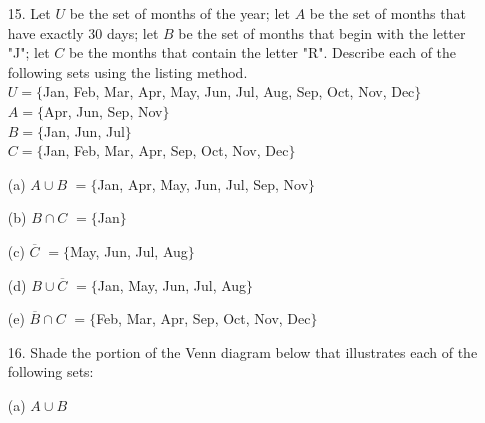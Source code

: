 \documentclass{article}
\def\rectset{(-4,-2.5) rectangle (2,2)}
\def\circleone{(-1.9,0.5) circle (1.2cm)}
\def\circletwo{(-0.1,0.5) circle (1.2cm)}
\def\circlethree{(-1,-1) circle (1.2cm)}
\begin{document}
\begin{itemize}
    \item[15.] Let $U$ be the set of months of the year; let $A$ be the set of months that have exactly 30 days; let $B$ be the set of months that begin with the letter "J"; let $C$ be the months that contain the letter "R". Describe each of the following sets using the listing method.\\
    $U = \{$Jan, Feb, Mar, Apr, May, Jun, Jul, Aug, Sep, Oct, Nov, Dec$\}$\\
    $A = \{$Apr, Jun, Sep, Nov$\}$\\
    $B = \{$Jan, Jun, Jul$\}$\\
    $C = \{$Jan, Feb, Mar, Apr, Sep, Oct, Nov, Dec$\}$
    
    (a) $A \cup B$
    {\color{blue}$= \{$Jan, Apr, May, Jun, Jul, Sep, Nov$\}$}
    
    (b) $B \cap C$
    {\color{blue}$= \{$Jan$\}$}
    
    (c) $\overline C$
     {\color{blue}$= \{$May, Jun, Jul, Aug$\}$}
    
    (d) $B \cup \overline C$
    {\color{blue}$= \{$Jan, May, Jun, Jul, Aug$\}$}
    
    (e) $\overline B \cap C$
    {\color{blue}$= \{$Feb, Mar, Apr, Sep, Oct, Nov, Dec$\}$}
    
    \item[16.] Shade the portion of the Venn diagram below that illustrates each of the following sets:
    
    (a) $A \cup B$\\
    

\end{itemize}
\end{document}

